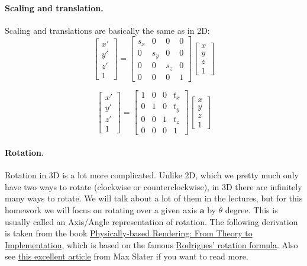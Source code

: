 \paragraph{Scaling and translation.} Scaling and translations are basically the same as in 2D:
\begin{equation}
\begin{bmatrix}
x' \\
y' \\
z' \\
1
\end{bmatrix}
=
\begin{bmatrix}
s_x & 0 & 0 & 0 \\
0 & s_y & 0 & 0 \\
0 & 0 & s_z & 0 \\
0 & 0 & 0 & 1
\end{bmatrix}
\begin{bmatrix}
x \\
y \\
z \\
1
\end{bmatrix}
\end{equation}

\begin{equation}
\begin{bmatrix}
x' \\
y' \\
z' \\
1
\end{bmatrix}
=
\begin{bmatrix}
1 & 0 & 0 & t_x \\
0 & 1 & 0 & t_y \\
0 & 0 & 1 & t_z \\
0 & 0 & 0 & 1
\end{bmatrix}
\begin{bmatrix}
x \\
y \\
z \\
1
\end{bmatrix}
\end{equation}

\paragraph{Rotation.} Rotation in 3D is a lot more complicated. Unlike 2D, which we pretty much only have two ways to rotate (clockwise or counterclockwise), in 3D there are infinitely many ways to rotate. We will talk about a lot of them in the lectures, but for this homework we will focus on rotating over a given axis $\mathbf{a}$ by $\theta$ degree. This is usually called an Axis/Angle representation of rotation. The following derivation is taken from the book \href{https://www.pbr-book.org/3ed-2018/Geometry_and_Transformations/Transformations}{Physically-based Rendering: From Theory to Implementation}, which is based on the famous \href{https://en.wikipedia.org/wiki/Rodrigues%27_rotation_formula}{Rodrigues' rotation formula}. Also see \href{https://thenumb.at/Exponential-Rotations/}{this excellent article} from Max Slater if you want to read more.

